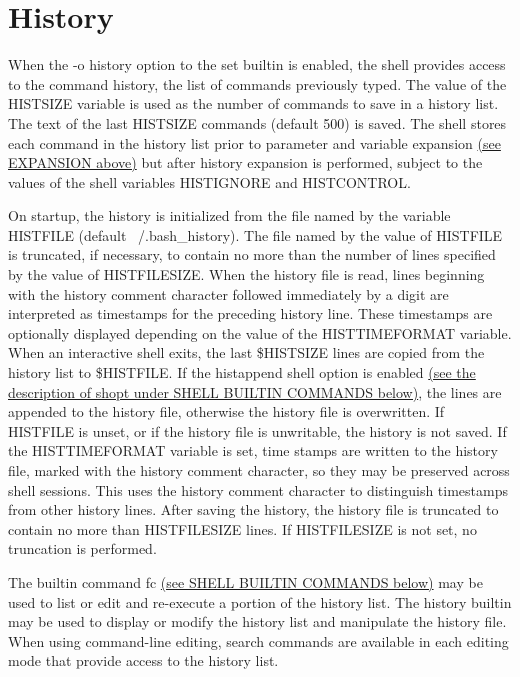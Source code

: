 \section{History}\label{sec:history}
When the -o history option to the set builtin is enabled, the shell provides access to the command history, the list of commands previously typed. The value of the HISTSIZE variable is used as the number of commands to save in a history list. The text of the last HISTSIZE commands (default 500) is saved. The shell stores each command in the history list prior to parameter and variable expansion \hyperref[sec:expansion]{(see EXPANSION above)} but after history expansion is performed, subject to the values of the shell variables HISTIGNORE and HISTCONTROL.

On startup, the history is initialized from the file named by the variable HISTFILE (default ~/.bash\_history). The file named by the value of HISTFILE is truncated, if necessary, to contain no more than the number of lines specified by the value of HISTFILESIZE. When the history file is read, lines beginning with the history comment character followed immediately by a digit are interpreted as timestamps for the preceding history line. These timestamps are optionally displayed depending on the value of the HISTTIMEFORMAT variable. When an interactive shell exits, the last \$HISTSIZE lines are copied from the history list to \$HISTFILE. If the histappend shell option is enabled \hyperref[sec:shellbuiltincommands]{(see the description of shopt under SHELL BUILTIN COMMANDS below)}, the lines are appended to the history file, otherwise the history file is overwritten. If HISTFILE is unset, or if the history file is unwritable, the history is not saved. If the HISTTIMEFORMAT variable is set, time stamps are written to the history file, marked with the history comment character, so they may be preserved across shell sessions. This uses the history comment character to distinguish timestamps from other history lines. After saving the history, the history file is truncated to contain no more than HISTFILESIZE lines. If HISTFILESIZE is not set, no truncation is performed.

The builtin command fc \hyperref[sec:shellbuiltincommands]{(see SHELL BUILTIN COMMANDS below)} may be used to list or edit and re-execute a portion of the history list. The history builtin may be used to display or modify the history list and manipulate the history file. When using command-line editing, search commands are available in each editing mode that provide access to the history list.

